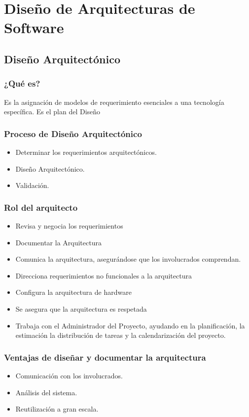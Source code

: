 \section{Diseño de Arquitecturas de Software}
\subsection{Diseño Arquitectónico}
\subsubsection{¿Qué es?}
Es la asignación de modelos de requerimiento esenciales a una tecnología específica. Es el plan del Diseño
\subsubsection{Proceso de Diseño Arquitectónico}
\begin{itemize}
	\item Determinar los requerimientos arquitectónicos.
	\item Diseño Arquitectónico.
	\item Validación.
\end{itemize}
\subsubsection{Rol del arquitecto}
\begin{itemize}
\item Revisa y negocia los requerimientos
\item Documentar la Arquitectura
\item Comunica la arquitectura, asegurándose que los involucrados comprendan.
\item Direcciona requerimientos no funcionales a la arquitectura
\item Configura la arquitectura de hardware
\item Se asegura que la arquitectura es respetada
\item Trabaja con el Administrador del Proyecto, ayudando en la planificación, la estimación la distribución de tareas y la calendarización del proyecto.
\end{itemize}
\subsubsection{Ventajas de diseñar y documentar la arquitectura}
\begin{itemize}
	\item Comunicación con los involucrados.
	\item Análisis del sistema.
	\item Reutilización a gran escala.
\end{itemize}
